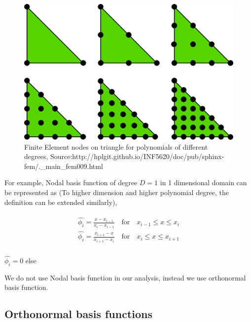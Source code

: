 \documentclass[a4paper]{book}
\begin{document}
\begin{figure}
  \includegraphics[width=\linewidth]{fem_triangle_2.png}
  \caption{Finite Element nodes on triangle for polynomials of different degrees, Source:http://hplgit.github.io/INF5620/doc/pub/sphinx-fem/.\_main\_fem009.html}
  \label{fig:Nodes on Triangular Element}
\end{figure}

For example, Nodal basis function of degree $D=1$ in 1 dimensional domain can be represented as (To higher dimension and higher polynomial degree, the definition can be extended similarly),

\begin{equation}
\begin{aligned}
\begin{split}
\hat{\phi_i} = \frac{x-x_{i-1}}{x_i-x_{i-1}} \quad \textrm{for} \quad x_{i-1} \leq x \leq x_i\\
\hat{\phi_i} = \frac{x_{i+1}-x}{x_{i+1}-x_{i}} \quad \textrm{for} \quad x_{i} \leq x \leq x_{i+1}\\
\end{split}
\end{aligned}
\end{equation}
\begin{center}
$\hat{\phi_i} = 0$ else
\end{center}

We do not use Nodal basis function in our analysis, instead we use orthonormal basis function.

\subsection{Orthonormal basis functions}
\end{document}
